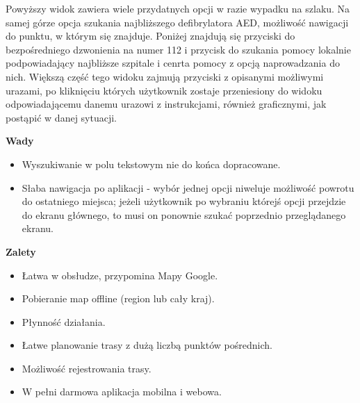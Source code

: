 Powyższy widok zawiera wiele przydatnych opcji w razie wypadku na szlaku. Na samej górze opcja szukania najbliższego defibrylatora AED, możliwość nawigacji do punktu, w którym się znajduje. Poniżej znajdują się przyciski do bezpośredniego dzwonienia na numer 112 i przycisk do szukania pomocy lokalnie podpowiadający najbliższe szpitale i cenrta pomocy z opcją naprowadzania do nich. Większą część tego widoku zajmują przyciski z opisanymi możliwymi urazami, po kliknięciu których użytkownik zostaje przeniesiony do widoku odpowiadającemu danemu urazowi z instrukcjami, również graficznymi, jak postąpić w danej sytuacji.

\textbf{Wady}
\begin{itemize}
    \item Wyszukiwanie w polu tekstowym nie do końca dopracowane.
    \item Słaba nawigacja po aplikacji - wybór jednej opcji niweluje możliwość powrotu do ostatniego miejsca; jeżeli użytkownik po wybraniu którejś opcji przejdzie do ekranu głównego, to musi on ponownie szukać poprzednio przeglądanego ekranu.
\end{itemize}
\textbf{Zalety}
\begin{itemize}
    \item Łatwa w obsłudze, przypomina Mapy Google.
    \item Pobieranie map offline (region lub cały kraj).
    \item Płynność działania.
    \item Łatwe planowanie trasy z dużą liczbą punktów pośrednich.
    \item Możliwość rejestrowania trasy.
    \item W pełni darmowa aplikacja mobilna i webowa.
\end{itemize}



